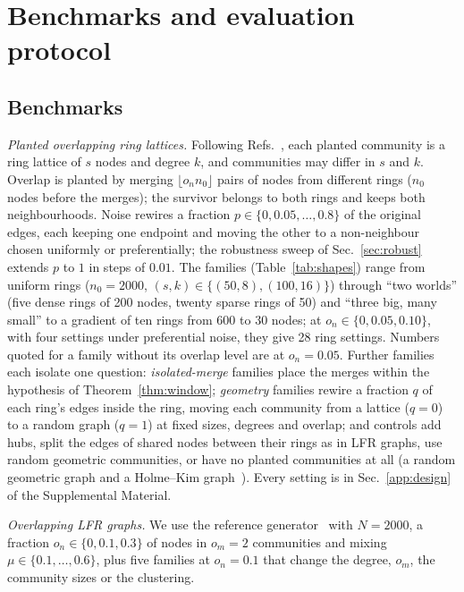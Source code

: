 \section{Benchmarks and evaluation protocol}
\label{sec:protocol}

\subsection{Benchmarks}
\label{sec:benchmarks}

\emph{Planted overlapping ring lattices.} Following
Refs.~\cite{watts1998collective,kanovsky2010small}, each planted community is a ring
lattice of $s$ nodes and degree $k$, and communities may differ in $s$ and $k$. Overlap is
planted by merging $\lfloor o_n n_0\rfloor$ pairs of nodes from different rings ($n_0$
nodes before the merges); the survivor belongs to both rings and keeps both
neighbourhoods. Noise rewires a fraction $p\in\{0,0.05,\dots,0.8\}$ of the original
edges, each keeping one endpoint and moving the other to a non-neighbour chosen
uniformly or preferentially; the robustness sweep of Sec.~\ref{sec:robust} extends $p$
to $1$ in steps of $0.01$. The families (Table~\ref{tab:shapes}) range from uniform
rings ($n_0=2000$, $(s,k)\in\{(50,8),(100,16)\}$) through ``two worlds'' (five dense rings
of 200 nodes, twenty sparse rings of 50) and ``three big, many small'' to a gradient of
ten rings from 600 to 30 nodes; at $o_n\in\{0,0.05,0.10\}$, with four settings under
preferential noise, they give 28 ring settings. Numbers quoted for a family without its overlap level
are at $o_n=0.05$. Further families each isolate one question: \emph{isolated-merge}
families place the merges within the hypothesis of Theorem~\ref{thm:window};
\emph{geometry} families rewire a fraction $q$ of each ring's edges inside the ring,
moving each community from a lattice ($q=0$) to a random graph ($q=1$) at fixed sizes,
degrees and overlap; and controls add hubs, split the edges of shared nodes between
their rings as in LFR graphs, use random geometric communities, or have no planted
communities at all (a random geometric graph and a Holme--Kim
graph~\cite{holme2002growing}). Every setting is in Sec.~\ref{app:design} of the
Supplemental Material.

\emph{Overlapping LFR graphs.} We use the reference
generator~\cite{lancichinetti2008benchmark,lancichinetti2009benchmarks} with $N=2000$, a
fraction $o_n\in\{0,0.1,0.3\}$ of nodes in $o_m=2$ communities and mixing
$\mu\in\{0.1,\dots,0.6\}$, plus five families at $o_n=0.1$ that change the degree, $o_m$,
the community sizes or the clustering.

